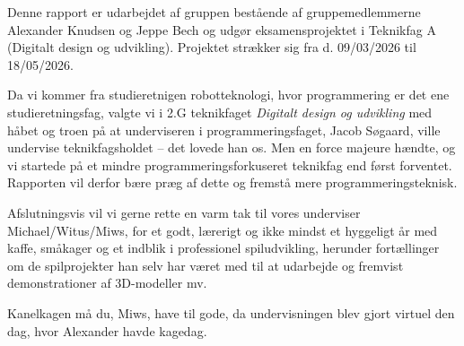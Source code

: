 Denne rapport er udarbejdet af gruppen bestående af gruppemedlemmerne Alexander Knudsen og Jeppe Bech og udgør eksamensprojektet i Teknikfag A (Digitalt design og udvikling). Projektet strækker sig fra d. 09/03/2026 til 18/05/2026.

Da vi kommer fra studieretnigen robotteknologi, hvor programmering er det ene studieretningsfag, valgte vi i 2.G teknikfaget \textit{Digitalt design og udvikling} med håbet og troen på at underviseren i programmeringsfaget, Jacob Søgaard, ville undervise teknikfagsholdet -- det lovede han os. Men en force majeure hændte, og vi startede på et mindre programmeringsforkuseret teknikfag end først forventet. Rapporten vil derfor bære præg af dette og fremstå mere programmeringsteknisk.

Afslutningsvis vil vi gerne rette en varm tak til vores underviser Michael/Witus/Miws, for et godt, lærerigt og ikke mindst et hyggeligt år med kaffe, småkager og et indblik i professionel spiludvikling, herunder fortællinger om de spilprojekter han selv har været med til at udarbejde og fremvist demonstrationer af 3D-modeller mv. 

Kanelkagen må du, Miws, have til gode, da undervisningen blev gjort virtuel den dag, hvor Alexander havde kagedag.

